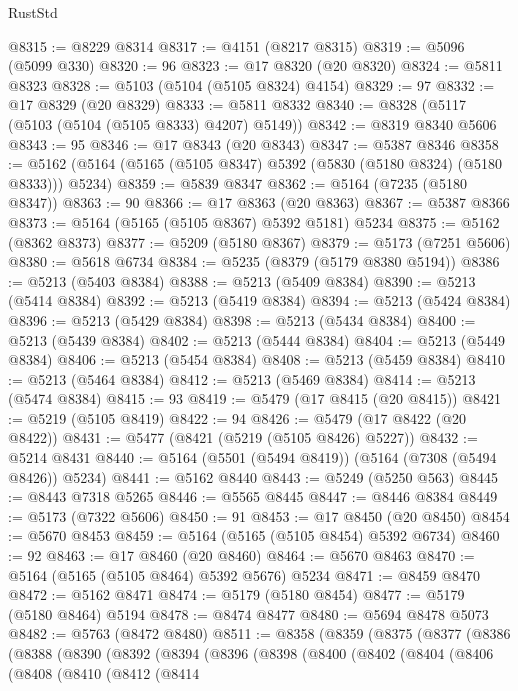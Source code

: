 \begin{lexlean}{RustStd}
\begin{coremodule}
@8315 := @8229 @8314
@8317 := @4151 (@8217 @8315)
@8319 := @5096 (@5099 @330)
@8320 := 96
@8323 := @17 @8320 (@20 @8320)
@8324 := @5811 @8323
@8328 := @5103 (@5104 (@5105 @8324) @4154)
@8329 := 97
@8332 := @17 @8329 (@20 @8329)
@8333 := @5811 @8332
@8340 := @8328 (@5117 (@5103 (@5104 (@5105 @8333) @4207) @5149))
@8342 := @8319 @8340 @5606
@8343 := 95
@8346 := @17 @8343 (@20 @8343)
@8347 := @5387 @8346
@8358 := @5162 (@5164 (@5165 (@5105 @8347) @5392 (@5830 (@5180 @8324) (@5180 @8333))) @5234)
@8359 := @5839 @8347
@8362 := @5164 (@7235 (@5180 @8347))
@8363 := 90
@8366 := @17 @8363 (@20 @8363)
@8367 := @5387 @8366
@8373 := @5164 (@5165 (@5105 @8367) @5392 @5181) @5234
@8375 := @5162 (@8362 @8373)
@8377 := @5209 (@5180 @8367)
@8379 := @5173 (@7251 @5606)
@8380 := @5618 @6734
@8384 := @5235 (@8379 (@5179 @8380 @5194))
@8386 := @5213 (@5403 @8384)
@8388 := @5213 (@5409 @8384)
@8390 := @5213 (@5414 @8384)
@8392 := @5213 (@5419 @8384)
@8394 := @5213 (@5424 @8384)
@8396 := @5213 (@5429 @8384)
@8398 := @5213 (@5434 @8384)
@8400 := @5213 (@5439 @8384)
@8402 := @5213 (@5444 @8384)
@8404 := @5213 (@5449 @8384)
@8406 := @5213 (@5454 @8384)
@8408 := @5213 (@5459 @8384)
@8410 := @5213 (@5464 @8384)
@8412 := @5213 (@5469 @8384)
@8414 := @5213 (@5474 @8384)
@8415 := 93
@8419 := @5479 (@17 @8415 (@20 @8415))
@8421 := @5219 (@5105 @8419)
@8422 := 94
@8426 := @5479 (@17 @8422 (@20 @8422))
@8431 := @5477 (@8421 (@5219 (@5105 @8426) @5227))
@8432 := @5214 @8431
@8440 := @5164 (@5501 (@5494 @8419)) (@5164 (@7308 (@5494 @8426)) @5234)
@8441 := @5162 @8440
@8443 := @5249 (@5250 @563)
@8445 := @8443 @7318 @5265
@8446 := @5565 @8445
@8447 := @8446 @8384
@8449 := @5173 (@7322 @5606)
@8450 := 91
@8453 := @17 @8450 (@20 @8450)
@8454 := @5670 @8453
@8459 := @5164 (@5165 (@5105 @8454) @5392 @6734)
@8460 := 92
@8463 := @17 @8460 (@20 @8460)
@8464 := @5670 @8463
@8470 := @5164 (@5165 (@5105 @8464) @5392 @5676) @5234
@8471 := @8459 @8470
@8472 := @5162 @8471
@8474 := @5179 (@5180 @8454)
@8477 := @5179 (@5180 @8464) @5194
@8478 := @8474 @8477
@8480 := @5694 @8478 @5073
@8482 := @5763 (@8472 @8480)
@8511 := @8358
    (@8359
      (@8375
        (@8377
          (@8386
            (@8388
              (@8390
                (@8392
                  (@8394
                    (@8396
                      (@8398
                        (@8400
                          (@8402
                            (@8404
                              (@8406
                                (@8408
                                  (@8410
                                    (@8412
                                      (@8414

\end{coremodule}
\end{lexlean}
